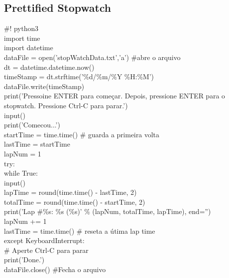 \documentclass[12pt, a4paper]{article}
\begin{document}
\subsection{Prettified Stopwatch}
\#! python3\\
import time \\
import datetime\\
dataFile = open('stopWatchData.txt','a') \#abre o arquivo\\
dt = datetime.datetime.now()\\
timeStamp = dt.strftime('\%d/\%m/\%Y  \%H:\%M')\\
dataFile.write(timeStamp)\\
print('Pressoine ENTER para começar. Depois, pressione ENTER para o stopwatch. Pressione Ctrl-C para parar.')\\
input()\\
print('Comecou...')\\
startTime = time.time()    \# guarda a primeira volta\\
lastTime = startTime\\
lapNum = 1\\
try:\\
while True:\\
input()\\
lapTime = round(time.time() - lastTime, 2)\\
totalTime = round(time.time() - startTime, 2)\\
print('Lap \#\%s: \%s (\%s)' \% (lapNum, totalTime, lapTime), end='')\\
lapNum += 1\\
lastTime = time.time() \# reseta a útima lap time\\
except KeyboardInterrupt:\\
\# Aperte Ctrl-C para parar\\
print('Done.')\\
dataFile.close() \#Fecha o arquivo\\

	
	
	
\end{document}

